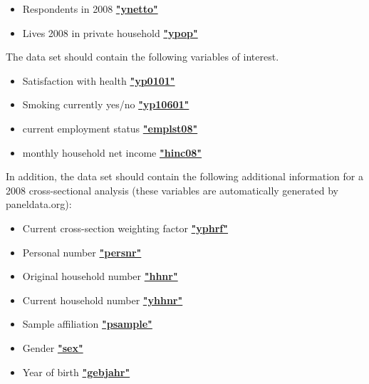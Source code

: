 \documentclass[letterpaper,10pt,openany,onesideH,english]{sphinxmanual}
\begin{document}
\begin{itemize}
\item {} 
Respondents in 2008  \href{https://paneldata.org/soep-core/data/ppfad/ynetto}{\textbf{"ynetto"}}

\item {} 
Lives 2008 in private household  \href{https://paneldata.org/soep-core/data/ppfad/ypop}{\textbf{"ypop"}}

\end{itemize}

The data set should contain the following variables of interest.
\begin{itemize}
\item {} 
Satisfaction with health  \href{https://paneldata.org/soep-core/data/yp/yp0101}{\textbf{"yp0101"}}

\item {} 
Smoking currently yes/no  \href{https://paneldata.org/soep-core/data/yp/yp10601}{\textbf{"yp10601"}}

\item {} 
current employment status  \href{https://paneldata.org/soep-core/data/ypgen/emplst08}{\textbf{"emplst08"}}

\item {} 
monthly household net income  \href{https://paneldata.org/soep-core/data/yhgen/hinc08}{\textbf{"hinc08"}}

\end{itemize}

In addition, the data set should contain the following additional information for a 2008 cross-sectional analysis (these variables are automatically generated by paneldata.org):
\begin{itemize}
\item {} 
Current cross-section weighting factor  \href{https://paneldata.org/soep-core/data/phrf/yphrf}{\textbf{"yphrf"}}

\item {} 
Personal number  \href{https://paneldata.org/soep-core/data/ppfad/persnr}{\textbf{"persnr"}}

\item {} 
Original household number  \href{https://paneldata.org/soep-core/data/ppfad/hhnr}{\textbf{"hhnr"}}

\item {} 
Current household number  \href{https://paneldata.org/soep-core/data/ppfad/yhhnr}{\textbf{"yhhnr"}}

\item {} 
Sample affiliation  \href{https://paneldata.org/soep-core/data/ppfad/psample}{\textbf{"psample"}}

\item {} 
Gender  \href{https://paneldata.org/soep-core/data/ppfad/sex}{\textbf{"sex"}}

\item {} 
Year of birth  \href{https://paneldata.org/soep-core/data/ppfad/gebjahr}{\textbf{"gebjahr"}}

\end{itemize}
\end{document}
